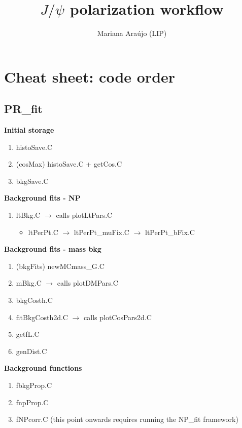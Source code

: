 \documentclass{article}
\begin{document}
\title{$J/\psi$ polarization workflow }
\author{Mariana Ara\'ujo (LIP)}
\maketitle

\tableofcontents

\pagebreak

\section{Cheat sheet: code order}
\subsection{PR\_fit}

\textbf{Initial storage}
\begin{enumerate}
\item histoSave.C
\item (cosMax) histoSave.C + getCos.C
\item bkgSave.C
\end{enumerate}

\textbf{Background fits - NP}
\begin{enumerate}
\item ltBkg.C $\rightarrow$ calls plotLtPars.C
\begin{itemize}
\item ltPerPt.C $\rightarrow$ ltPerPt\_muFix.C $\rightarrow$ ltPerPt\_bFix.C
\end{itemize}
\end{enumerate}

\textbf{Background fits - mass bkg}
\begin{enumerate}
\item (bkgFits) newMCmass\_G.C
\item mBkg.C $\rightarrow$ calls plotDMPars.C
\item bkgCosth.C
\item fitBkgCosth2d.C $\rightarrow$ calls plotCosPars2d.C
\item getfL.C
\item genDist.C
\end{enumerate}

\textbf{Background functions}
\begin{enumerate}
\item fbkgProp.C
\item fnpProp.C
\item fNPcorr.C (this point onwards requires running the NP\_fit framework)
\end{enumerate}
\end{document}

